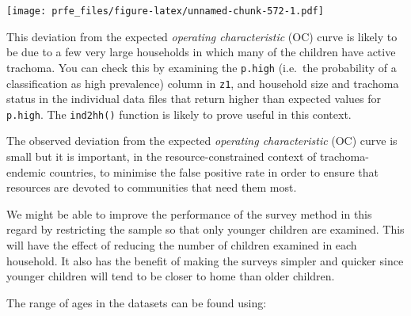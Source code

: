 \documentclass[12pt,a4paper]{book}
\newenvironment{Shaded}{\begin{snugshade}}{\end{snugshade}}
\newcommand{\CharTok}[1]{\textcolor[rgb]{0.31,0.60,0.02}{#1}}
\newcommand{\ControlFlowTok}[1]{\textcolor[rgb]{0.13,0.29,0.53}{\textbf{#1}}}
\newcommand{\DataTypeTok}[1]{\textcolor[rgb]{0.13,0.29,0.53}{#1}}
\newcommand{\KeywordTok}[1]{\textcolor[rgb]{0.13,0.29,0.53}{\textbf{#1}}}
\newcommand{\NormalTok}[1]{#1}
\newcommand{\OperatorTok}[1]{\textcolor[rgb]{0.81,0.36,0.00}{\textbf{#1}}}
\newcommand{\OtherTok}[1]{\textcolor[rgb]{0.56,0.35,0.01}{#1}}
\newcommand{\StringTok}[1]{\textcolor[rgb]{0.31,0.60,0.02}{#1}}
\theoremstyle{definition}
\theoremstyle{definition}
\theoremstyle{definition}
\theoremstyle{remark}
\begin{document}
\texttt{[image: prfe\_files/figure-latex/unnamed-chunk-572-1.pdf]}

This deviation from the expected \emph{operating characteristic} (OC)
curve is likely to be due to a few very large households in which many
of the children have active trachoma. You can check this by examining
the \texttt{p.high} (i.e.~the probability of a classification as high
prevalence) column in \texttt{z1}, and household size and trachoma
status in the individual data files that return higher than expected
values for \texttt{p.high}. The \texttt{ind2hh()} function is likely to
prove useful in this context.

The observed deviation from the expected \emph{operating characteristic}
(OC) curve is small but it is important, in the resource-constrained
context of trachoma-endemic countries, to minimise the false positive
rate in order to ensure that resources are devoted to communities that
need them most.

We might be able to improve the performance of the survey method in this
regard by restricting the sample so that only younger children are
examined. This will have the effect of reducing the number of children
examined in each household. It also has the benefit of making the
surveys simpler and quicker since younger children will tend to be
closer to home than older children.

The range of ages in the datasets can be found using:

\begin{Shaded}
\end{Shaded}
\end{document}
